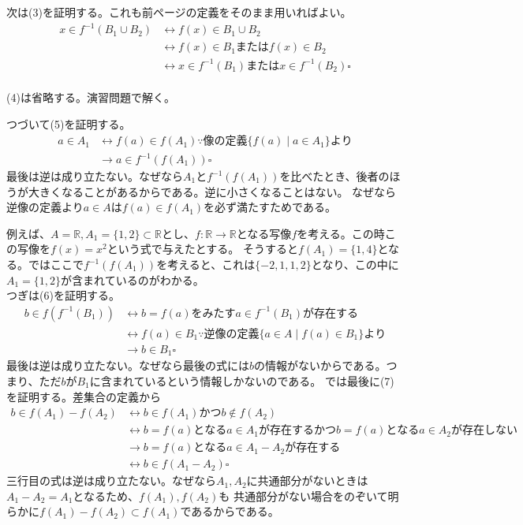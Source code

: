 \documentclass[a4j,dvipdfmx]{jsarticle}
\begin{document}
次は(3)を証明する。これも前ページの定義をそのまま用いればよい。
\begin{align*}
    x\in f^{-1}(B_1\cup B_2)
    &\leftrightarrow f(x)\in B_1\cup B_2\\
    &\leftrightarrow f(x)\in B_1またはf(x)\in B_2\\
    &\leftrightarrow x\in f^{-1}(B_1)またはx\in f^{-1}(B_2)\square
\end{align*}
\hrulefill\\
(4)は省略する。演習問題で解く。\\
\hrulefill

つづいて(5)を証明する。\\
\begin{align*}
    a\in A_1
    &\leftrightarrow f(a)\in f(A_1) \because 像の定義 \{f(a)\mid a\in A_1\} より\\
    &\rightarrow a\in f^{-1}(f(A_1))\square 
\end{align*}
最後は逆は成り立たない。なぜなら$A_1$と$f^{-1}(f(A_1))$を比べたとき、後者のほうが大きくなることがあるからである。逆に小さくなることはない。
なぜなら逆像の定義より$a \in A$は$f(a)\in f(A_1)$を必ず満たすためである。

例えば、$A=\mathbb{R},A_1=\{1,2\}\subset\mathbb{R}$とし、$f:\mathbb{R}\to\mathbb{R}$となる写像$f$を考える。この時この写像を$f(x)=x^2$という式で与えたとする。
そうすると$f(A_1)=\{1,4\}$となる。ではここで$f^{-1}(f(A_1))$を考えると、これは$\{-2,1,1,2\}$となり、この中に$A_1=\{1,2\}$が含まれているのがわかる。\\

つぎは(6)を証明する。
\begin{align*}
    b\in f(f^{-1}(B_1))
    &\leftrightarrow b=f(a)をみたすa\in f^{-1}(B_1)が存在する\\
    &\leftrightarrow f(a)\in B_1\because 逆像の定義 \{a\in A\mid f(a)\in B_1\}より\\
    &\rightarrow b\in B_1\square
\end{align*}
最後は逆は成り立たない。なぜなら最後の式には$b$の情報がないからである。つまり、ただ$b$が$B_1$に含まれているという情報しかないのである。
\newpage
では最後に(7)を証明する。差集合の定義から
\begin{align*}
    b\in f(A_1)-f(A_2) 
    &\leftrightarrow b\in f(A_1)かつb\notin f(A_2)\\
    &\leftrightarrow b=f(a)となるa\in A_1が存在するかつb=f(a)となるa\in A_2が存在しない\\
    &\rightarrow b=f(a)となるa\in A_1-A_2が存在する\\
    &\leftrightarrow b\in f(A_1-A_2)\square
\end{align*}
三行目の式は逆は成り立たない。なぜなら$A_1,A_2$に共通部分がないときは$A_1-A_2=A_1$となるため、$f(A_1),f(A_2)$も
共通部分がない場合をのぞいて明らかに$f(A_1)-f(A_2)\subset f(A_1)$であるからである。
\end{document}
